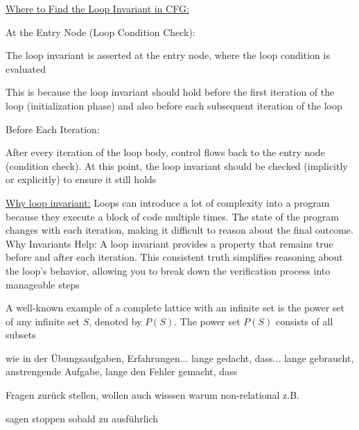 \documentclass[landscape, a4paper]{article}
\begin{document}
\begin{minipage}[t]{0.2\linewidth}
\begin{betterlist}
\begin{betterlist}
		\end{betterlist}
		\item \underline{Where to Find the Loop Invariant in CFG:}
		\begin{betterlist}
			\item At the Entry Node (Loop Condition Check):
			\begin{betterlist}
				\item The loop invariant is asserted at the entry node, where the loop condition is evaluated
				\item This is because the loop invariant should hold before the first iteration of the loop (initialization phase) and also before each subsequent iteration of the loop
			\end{betterlist}
			\item Before Each Iteration:
			\begin{betterlist}
				\item After every iteration of the loop body, control flows back to the entry node (condition check). At this point, the loop invariant should be checked (implicitly or explicitly) to ensure it still holds
			\end{betterlist}
		\end{betterlist}
		\item \underline{Why loop invariant:} Loops can introduce a lot of complexity into a program because they execute a block of code multiple times. The state of the program changes with each iteration, making it difficult to reason about the final outcome. Why Invariants Help: A loop invariant provides a property that remains true before and after each iteration. This consistent truth simplifies reasoning about the loop's behavior, allowing you to break down the verification process into manageable steps
    \item A well-known example of a complete lattice with an infinite set is the power set of any infinite set $S$, denoted by $P(S)$. The power set $P(S)$ consists of all subsets
		\item wie in der Übungsaufgaben, Erfahrungen... lange gedacht, dass... lange gebraucht, anstrengende Aufgabe, lange den Fehler gemacht, dass
		\item Fragen zurück stellen, wollen auch wisssen warum non-relational z.B.
		\item sagen stoppen sobald zu ausführlich
	\end{betterlist}
\end{minipage}
\begin{minipage}[t]{0.2\linewidth}
\end{minipage}
\begin{minipage}[t]{0.2\linewidth}
\end{minipage}
\end{document}
